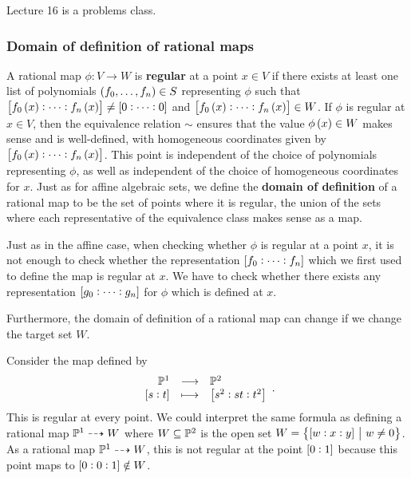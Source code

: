 Lecture 16 is a problems class.

\pagebreak

\subsubsection{Domain of definition of rational maps}


\begin{definition*}
A rational map $ \phi : V \to W $ is \textbf{regular} at a point $ x \in V $ if there exists at least one list of polynomials $ \br{f_0, \dots, f_n} \in S $ representing $ \phi $ such that $ \sbr{f_0\br{x} : \dots : f_n\br{x}} \ne \sbr{0 : \dots : 0} $ and $ \sbr{f_0\br{x} : \dots : f_n\br{x}} \in W $. If $ \phi $ is regular at $ x \in V $, then the equivalence relation $ \sim $ ensures that the value $ \phi\br{x} \in W $ makes sense and is well-defined, with homogeneous coordinates given by $ \sbr{f_0\br{x} : \dots : f_n\br{x}} $. This point is independent of the choice of polynomials representing $ \phi $, as well as independent of the choice of homogeneous coordinates for $ x $. Just as for affine algebraic sets, we define the \textbf{domain of definition} of a rational map to be the set of points where it is regular, the union of the sets where each representative of the equivalence class makes sense as a map.
\end{definition*}

\begin{note*}
Just as in the affine case, when checking whether $ \phi $ is regular at a point $ x $, it is not enough to check whether the representation $ \sbr{f_0 : \dots : f_n} $ which we first used to define the map is regular at $ x $. We have to check whether there exists any representation $ \sbr{g_0 : \dots : g_n} $ for $ \phi $ which is defined at $ x $.
\end{note*}

\begin{note*}
Furthermore, the domain of definition of a rational map can change if we change the target set $ W $.
\end{note*}

\begin{example*}
Consider the map defined by
$$ \function{\PP^1}{\PP^2}{\sbr{s : t}}{\sbr{s^2 : st : t^2}}. $$
This is regular at every point. We could interpret the same formula as defining a rational map $ \mathbb{P}^1 \dashrightarrow W $ where $ W \subseteq \mathbb{P}^2 $ is the open set $ W = \cbr{\sbr{w : x : y} \st w \ne 0} $. As a rational map $ \mathbb{P}^1 \dashrightarrow W $, this is not regular at the point $ \sbr{0 : 1} $ because this point maps to $ \sbr{0 : 0 : 1} \notin W $.
\end{example*}

